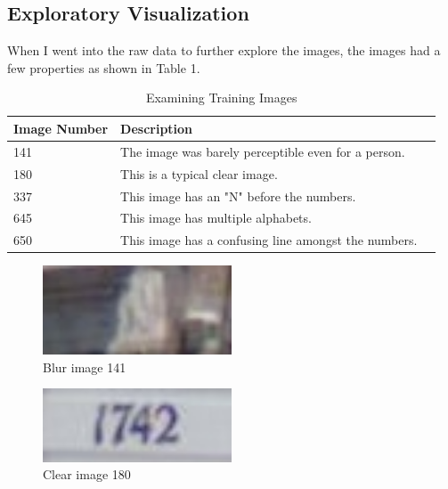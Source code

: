 \documentclass[twoside, column]{article}
\begin{document}
\subsection{Exploratory Visualization}

When I went into the raw data to further explore the images, the images had a few properties as shown in Table 1. 

\begin{table}[htp]
\caption{Examining Training Images}
\begin{center}
\begin{tabular}{llr}

\cmidrule(r){1-2}
Image Number & Description \\
\midrule
141 & The image was barely perceptible even for a person.\\
180 & This is a typical clear image. \\
337 & This image has an "N" before the numbers. \\
645 & This image has multiple alphabets. \\
650 & This image has a confusing line amongst the numbers. \\

\end{tabular}
\end{center}
\label{default}
\end{table}

\begin{figure}
\caption{Blur image 141}
\centering
\includegraphics[width=0.5\textwidth]{141_blur}
\end{figure}

\begin{figure}
\caption{Clear image 180}
\centering
\includegraphics[width=0.5\textwidth]{180_clear}
\end{figure}
\end{document}
